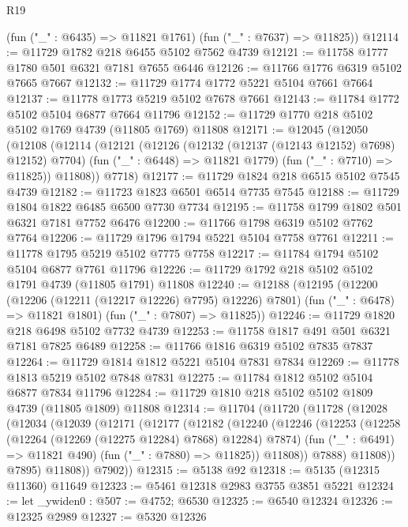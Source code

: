 \begin{lexlean}{R19}
\begin{coremodule}
{{{{{{{{{{{      (fun ("_" : @6435) => @11821 @1761)
      (fun ("_" : @7637) => @11825))
@12114 := @11729 @1782 @218 @6455 @5102 @7562 @4739
@12121 := @11758 @1777 @1780 @501 @6321 @7181 @7655 @6446
@12126 := @11766 @1776 @6319 @5102 @7665 @7667
@12132 := @11729 @1774 @1772 @5221 @5104 @7661 @7664
@12137 := @11778 @1773 @5219 @5102 @7678 @7661
@12143 := @11784 @1772 @5102 @5104 @6877 @7664 @11796
@12152 := @11729 @1770 @218 @5102 @5102 @1769 @4739 (@11805 @1769) @11808
@12171 := @12045
    (@12050
      (@12108
        (@12114
          (@12121
            (@12126 (@12132 (@12137 (@12143 @12152) @7698) @12152) @7704)
            (fun ("_" : @6448) => @11821 @1779)
            (fun ("_" : @7710) => @11825))
          @11808))
      @7718)
@12177 := @11729 @1824 @218 @6515 @5102 @7545 @4739
@12182 := @11723 @1823 @6501 @6514 @7735 @7545
@12188 := @11729 @1804 @1822 @6485 @6500 @7730 @7734
@12195 := @11758 @1799 @1802 @501 @6321 @7181 @7752 @6476
@12200 := @11766 @1798 @6319 @5102 @7762 @7764
@12206 := @11729 @1796 @1794 @5221 @5104 @7758 @7761
@12211 := @11778 @1795 @5219 @5102 @7775 @7758
@12217 := @11784 @1794 @5102 @5104 @6877 @7761 @11796
@12226 := @11729 @1792 @218 @5102 @5102 @1791 @4739 (@11805 @1791) @11808
@12240 := @12188
    (@12195
      (@12200 (@12206 (@12211 (@12217 @12226) @7795) @12226) @7801)
      (fun ("_" : @6478) => @11821 @1801)
      (fun ("_" : @7807) => @11825))
@12246 := @11729 @1820 @218 @6498 @5102 @7732 @4739
@12253 := @11758 @1817 @491 @501 @6321 @7181 @7825 @6489
@12258 := @11766 @1816 @6319 @5102 @7835 @7837
@12264 := @11729 @1814 @1812 @5221 @5104 @7831 @7834
@12269 := @11778 @1813 @5219 @5102 @7848 @7831
@12275 := @11784 @1812 @5102 @5104 @6877 @7834 @11796
@12284 := @11729 @1810 @218 @5102 @5102 @1809 @4739 (@11805 @1809) @11808
@12314 := @11704
    (@11720
      (@11728
        (@12028
          (@12034
            (@12039
              (@12171
                (@12177
                  (@12182
                    (@12240
                      (@12246
                        (@12253
                          (@12258 (@12264 (@12269 (@12275 @12284) @7868) @12284) @7874)
                          (fun ("_" : @6491) => @11821 @490)
                          (fun ("_" : @7880) => @11825))
                        @11808))
                    @7888)
                  @11808))
              @7895)
            @11808))
        @7902))
@12315 := @5138 @92
@12318 := @5135 (@12315 @11360) @11649
@12323 := @5461 @12318 @2983 @3755 @3851 @5221
@12324 := let _ywiden0 : @507 := @4752; @6530
@12325 := @6540 @12324
@12326 := @12325 @2989
@12327 := @5320 @12326
}}}}}}}}}}}
\end{coremodule}
\end{lexlean}
